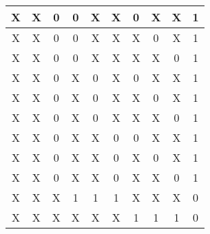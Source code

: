 \begin{center}
\begin{table}[h]
\begin{center}
\begin{tabular}{|c|c|c|c|c|c|c|c|c||c|}
            X  & X  & 0  & 0  & X  & X  & 0  & X  & X  & 1 \\ \hline
            X  & X  & 0  & 0  & X  & X  & X  & 0  & X  & 1 \\ \hline
            X  & X  & 0  & 0  & X  & X  & X  & X  & 0  & 1 \\ \hline
            X  & X  & 0  & X  & 0  & X  & 0  & X  & X  & 1 \\ \hline
            X  & X  & 0  & X  & 0  & X  & X  & 0  & X  & 1 \\ \hline
            X  & X  & 0  & X  & 0  & X  & X  & X  & 0  & 1 \\ \hline
            X  & X  & 0  & X  & X  & 0  & 0  & X  & X  & 1 \\ \hline
            X  & X  & 0  & X  & X  & 0  & X  & 0  & X  & 1 \\ \hline
            X  & X  & 0  & X  & X  & 0  & X  & X  & 0  & 1 \\ \hline
            X  & X  & X  & 1  & 1  & 1  & X  & X  & X  & 0 \\ \hline
            X  & X  & X  & X  & X  & X  & 1  & 1  & 1  & 0 \\ \hline
            \end{tabular}
        \end{center}
    \end{table}
\end{center}
